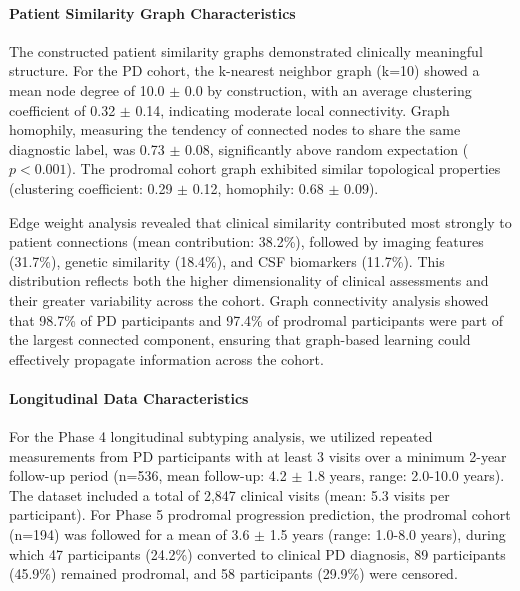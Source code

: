 \paragraph{Patient Similarity Graph Characteristics}
The constructed patient similarity graphs demonstrated clinically meaningful structure. For the PD cohort, the k-nearest neighbor graph (k=10) showed a mean node degree of 10.0 $\pm$ 0.0 by construction, with an average clustering coefficient of 0.32 $\pm$ 0.14, indicating moderate local connectivity. Graph homophily, measuring the tendency of connected nodes to share the same diagnostic label, was 0.73 $\pm$ 0.08, significantly above random expectation ($p < 0.001$). The prodromal cohort graph exhibited similar topological properties (clustering coefficient: 0.29 $\pm$ 0.12, homophily: 0.68 $\pm$ 0.09).

Edge weight analysis revealed that clinical similarity contributed most strongly to patient connections (mean contribution: 38.2\%), followed by imaging features (31.7\%), genetic similarity (18.4\%), and CSF biomarkers (11.7\%). This distribution reflects both the higher dimensionality of clinical assessments and their greater variability across the cohort. Graph connectivity analysis showed that 98.7\% of PD participants and 97.4\% of prodromal participants were part of the largest connected component, ensuring that graph-based learning could effectively propagate information across the cohort.

\paragraph{Longitudinal Data Characteristics}
For the Phase 4 longitudinal subtyping analysis, we utilized repeated measurements from PD participants with at least 3 visits over a minimum 2-year follow-up period (n=536, mean follow-up: 4.2 $\pm$ 1.8 years, range: 2.0-10.0 years). The dataset included a total of 2,847 clinical visits (mean: 5.3 visits per participant). For Phase 5 prodromal progression prediction, the prodromal cohort (n=194) was followed for a mean of 3.6 $\pm$ 1.5 years (range: 1.0-8.0 years), during which 47 participants (24.2\%) converted to clinical PD diagnosis, 89 participants (45.9\%) remained prodromal, and 58 participants (29.9\%) were censored.
